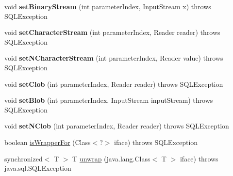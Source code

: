 \begin{DoxyCompactItemize}
\item 
\mbox{\label{classcom_1_1mysql_1_1cj_1_1jdbc_1_1_prepared_statement_wrapper_a95adcf975e43aa8e7dc9561173570929}} 
void {\bfseries set\+Binary\+Stream} (int parameter\+Index, Input\+Stream x)  throws S\+Q\+L\+Exception 
\item 
\mbox{\label{classcom_1_1mysql_1_1cj_1_1jdbc_1_1_prepared_statement_wrapper_a0544d24d9fec9e0843352d6f92459891}} 
void {\bfseries set\+Character\+Stream} (int parameter\+Index, Reader reader)  throws S\+Q\+L\+Exception 
\item 
\mbox{\label{classcom_1_1mysql_1_1cj_1_1jdbc_1_1_prepared_statement_wrapper_a8ab9e8d5624c617053ec45a5617abfa9}} 
void {\bfseries set\+N\+Character\+Stream} (int parameter\+Index, Reader value)  throws S\+Q\+L\+Exception 
\item 
\mbox{\label{classcom_1_1mysql_1_1cj_1_1jdbc_1_1_prepared_statement_wrapper_a64703007d7d7d4ea029abbb7d0142cf0}} 
void {\bfseries set\+Clob} (int parameter\+Index, Reader reader)  throws S\+Q\+L\+Exception 
\item 
\mbox{\label{classcom_1_1mysql_1_1cj_1_1jdbc_1_1_prepared_statement_wrapper_acfe0423c4e0623d4ca16f9c6b7f49fa5}} 
void {\bfseries set\+Blob} (int parameter\+Index, Input\+Stream input\+Stream)  throws S\+Q\+L\+Exception 
\item 
\mbox{\label{classcom_1_1mysql_1_1cj_1_1jdbc_1_1_prepared_statement_wrapper_aa9a25fc276aacea5dc108eaf37e2d3c9}} 
void {\bfseries set\+N\+Clob} (int parameter\+Index, Reader reader)  throws S\+Q\+L\+Exception 
\item 
boolean \mbox{\hyperlink{classcom_1_1mysql_1_1cj_1_1jdbc_1_1_prepared_statement_wrapper_a316f20ff93887f64bc06e86eac294a38}{is\+Wrapper\+For}} (Class$<$?$>$ iface)  throws S\+Q\+L\+Exception 
\item 
synchronized$<$ T $>$ T \mbox{\hyperlink{classcom_1_1mysql_1_1cj_1_1jdbc_1_1_prepared_statement_wrapper_aa3017e3af24221f89c4eac71808024c2}{unwrap}} (java.\+lang.\+Class$<$ T $>$ iface)  throws java.\+sql.\+S\+Q\+L\+Exception 

\end{DoxyCompactItemize}
